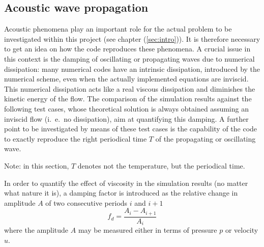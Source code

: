 \documentclass{report}
\begin{document}
\subsection{Acoustic wave propagation}
\label{sec:AcousticWavePropagation_GenIntro}
Acoustic phenomena play an important role for the actual problem to be investigated within this project (see chapter (\ref{sec:intro})). It is therefore necessary to get an idea on how the code reproduces these phenomena. A crucial issue in this context is the damping of oscillating or propagating waves due to numerical dissipation: many numerical codes have an intrinsic dissipation, introduced by the numerical scheme, even when the actually implemented equations are inviscid. This numerical dissipation acts like a real viscous dissipation and diminishes the kinetic energy of the flow. The comparison of the simulation results against the following test cases, whose theoretical solution is always obtained assuming an inviscid flow (i.\ e.\ no dissipation), aim at quantifying this damping. A further point to be investigated by means of these test cases is the capability of the code to exactly reproduce the right periodical time $T$ of the propagating or oscillating wave.

Note: in this section, $T$ denotes not the temperature, but the periodical time. 

 
In order to quantify the effect of viscosity in the simulation results (no matter what nature it is), a damping factor
is introduced as the relative change in amplitude $A$ of two consecutive periods $i$ and $i+1$
\begin{equation}
\label{eq:DampingFactor}
 f_d=\frac{A_i-A_{i+1}}{A_i}
\end{equation}
where the amplitude $A$ may be measured either in terms of pressure $p$ or velocity $u$.

\end{document}
